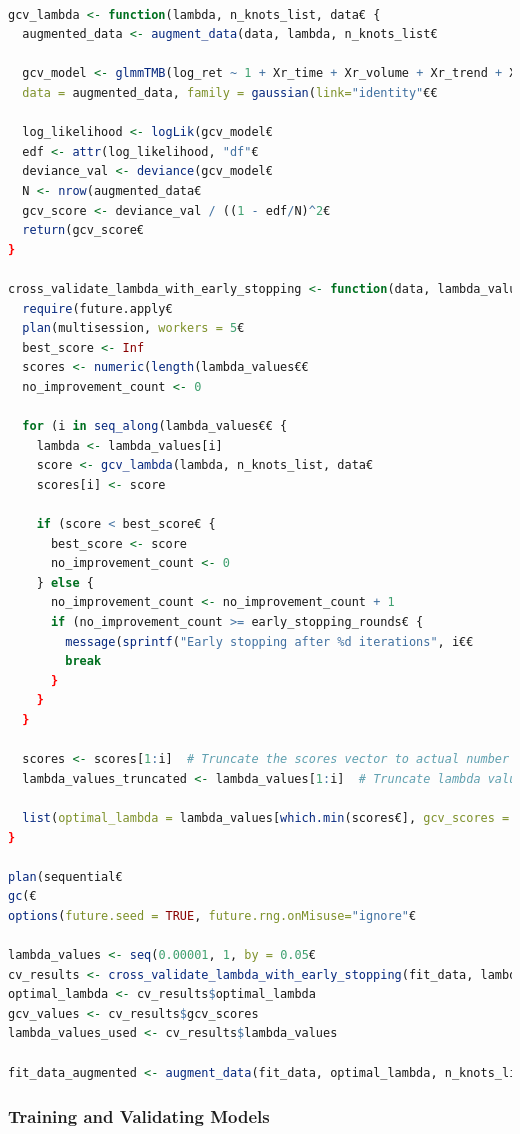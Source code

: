 \documentclass[12pt, twoside,hidelinks]{article}
\theoremstyle{definition}
\numberwithin{equation}{section}
\begin{document}
\begin{lstlisting}[language=R]
    
gcv_lambda <- function(lambda, n_knots_list, data€ {
  augmented_data <- augment_data(data, lambda, n_knots_list€
  
  gcv_model <- glmmTMB(log_ret ~ 1 + Xr_time + Xr_volume + Xr_trend + Xr_seasonal, 
  data = augmented_data, family = gaussian(link="identity"€€
  
  log_likelihood <- logLik(gcv_model€
  edf <- attr(log_likelihood, "df"€
  deviance_val <- deviance(gcv_model€
  N <- nrow(augmented_data€
  gcv_score <- deviance_val / ((1 - edf/N)^2€
  return(gcv_score€
}

cross_validate_lambda_with_early_stopping <- function(data, lambda_values, n_knots_list, early_stopping_rounds = 5€ {
  require(future.apply€
  plan(multisession, workers = 5€
  best_score <- Inf
  scores <- numeric(length(lambda_values€€
  no_improvement_count <- 0
  
  for (i in seq_along(lambda_values€€ {
    lambda <- lambda_values[i]
    score <- gcv_lambda(lambda, n_knots_list, data€
    scores[i] <- score
    
    if (score < best_score€ {
      best_score <- score
      no_improvement_count <- 0
    } else {
      no_improvement_count <- no_improvement_count + 1
      if (no_improvement_count >= early_stopping_rounds€ {
        message(sprintf("Early stopping after %d iterations", i€€
        break
      }
    }
  }
  
  scores <- scores[1:i]  # Truncate the scores vector to actual number of iterations
  lambda_values_truncated <- lambda_values[1:i]  # Truncate lambda values to match the scores length
  
  list(optimal_lambda = lambda_values[which.min(scores€], gcv_scores = scores, lambda_values = lambda_values_truncated€
}

plan(sequential€
gc(€
options(future.seed = TRUE, future.rng.onMisuse="ignore"€

lambda_values <- seq(0.00001, 1, by = 0.05€
cv_results <- cross_validate_lambda_with_early_stopping(fit_data, lambda_values, n_knots_list, early_stopping_rounds = 5€
optimal_lambda <- cv_results$optimal_lambda
gcv_values <- cv_results$gcv_scores
lambda_values_used <- cv_results$lambda_values

fit_data_augmented <- augment_data(fit_data, optimal_lambda, n_knots_list)
\end{lstlisting}

\subsubsection{Training and Validating Models}
\end{document}
